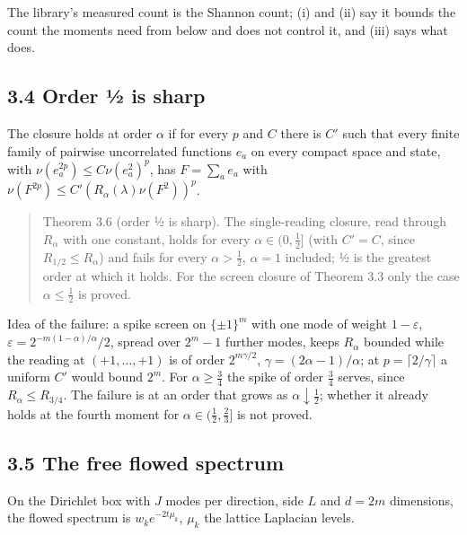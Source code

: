 \documentclass[10pt,letterpaper,twocolumn]{article}
\begin{document}
The library's measured count is the Shannon count; (i) and (ii) say it bounds the count the moments need from below and does not control it, and (iii) says what does.

\subsection{3.4 Order ½ is sharp}\label{34-order--is-sharp}

The closure holds at order \(\alpha\) if for every \(p\) and \(C\) there is \(C'\) such that every finite family of pairwise uncorrelated functions \(e_a\) on every compact space and state, with \(\nu(e_a^{2p})\le C\nu(e_a^2)^p\), has \(F=\sum_ae_a\) with \(\nu(F^{2p})\le C'(R_\alpha(\lambda)\nu(F^2))^p\).

\begin{quote}
Theorem 3.6 (order ½ is sharp). The single-reading closure, read through \(R_\alpha\) with one constant, holds for every \(\alpha\in(0,\tfrac12]\) (with \(C'=C\), since \(R_{1/2}\le R_\alpha\)) and fails for every \(\alpha>\tfrac12\), \(\alpha=1\) included; ½ is the greatest order at which it holds. For the screen closure of Theorem 3.3 only the case \(\alpha\le\tfrac12\) is proved.
\end{quote}

Idea of the failure: a spike screen on \(\{\pm1\}^m\) with one mode of weight \(1-\varepsilon\), \(\varepsilon=2^{-m(1-\alpha)/\alpha}/2\), spread over \(2^m-1\) further modes, keeps \(R_\alpha\) bounded while the reading at \((+1,\dots,+1)\) is of order \(2^{m\gamma/2}\), \(\gamma=(2\alpha-1)/\alpha\); at \(p=\lceil2/\gamma\rceil\) a uniform \(C'\) would bound \(2^m\). For \(\alpha\ge\tfrac34\) the spike of order \(\tfrac34\) serves, since \(R_\alpha\le R_{3/4}\). The failure is at an order that grows as \(\alpha\downarrow\tfrac12\); whether it already holds at the fourth moment for \(\alpha\in(\tfrac12,\tfrac23]\) is not proved.

\subsection{3.5 The free flowed spectrum}\label{35-the-free-flowed-spectrum}

On the Dirichlet box with \(J\) modes per direction, side \(L\) and \(d=2m\) dimensions, the flowed spectrum is \(w_ke^{-2t\mu_k}\), \(\mu_k\) the lattice Laplacian levels.
\end{document}
